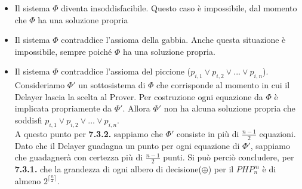 \documentclass[it]{article}
\begin{document}
    \begin{itemize}
        \item Il sistema $\Phi$ diventa insoddisfacibile. Questo caso è impossibile, dal momento che $\Phi$ ha una soluzione propria
        \item Il sistema $\Phi$ contraddice l'assioma della gabbia. Anche questa situazione è impossibile, sempre poiché $\Phi$ ha una soluzione propria.
        \item Il sistema $\Phi$ contraddice l'assioma del piccione ($p_{i,1} \lor p_{i,2} \lor ... \lor p_{i,n}$). Consideriamo $\Phi'$ un sottosistema di $\Phi$ che corrisponde al momento in cui il Delayer lascia la scelta al Prover. Per costruzione ogni equazione da $\Phi$ è implicata propriamente da $\Phi'$. Allora $\Phi'$ non ha alcuna soluzione propria che soddisfi $p_{i,1} \lor p_{i,2} \lor ... \lor p_{i,n}$. \\
        A questo punto per \textbf{7.3.2.} sappiamo che $\Phi'$ consiste in più di $\frac{n-1}{2}$ equazioni. Dato che il Delayer guadagna un punto per ogni equazione di $\Phi'$, sappiamo che guadagnerà con certezza più di $\frac{n-1}{2}$ punti. Si può perciò concludere, per \textbf{7.3.1.} che la grandezza di ogni albero di decisione($\oplus$) per il $PHP_{n}^{m}$ è di almeno $2^{\lceil \frac{n}{2} \rceil}$.
    \end{itemize}

    \newpage
    
    
    
    
    
\end{document}
